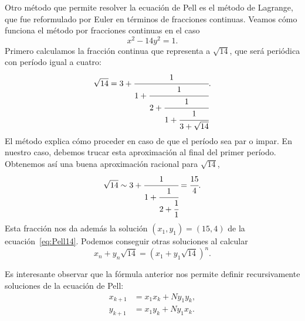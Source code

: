 Otro método que permite resolver la ecuación de Pell es el método de Lagrange,
que fue reformulado por Euler en términos de fracciones continuas. 
%
%
Veamos cómo funciona el método por fracciones continuas en el caso
\begin{equation}
	\label{eq:Pell14}
	x^2-14y^2=1.
\end{equation}
Primero calculamos la fracción continua que representa a $\sqrt{14}$, que será
periódica con período igual a cuatro:
\[
	\sqrt{14}=3+\cfrac{1}{1+\cfrac{1}{2+\cfrac{1}{1+\cfrac{1}{3+\sqrt{14}}}}}.
\]
El método explica cómo proceder en caso de que el período sea par o impar. En
nuestro caso, debemos trucar esta aproximación al final del primer período.
Obtenemos así una buena aproximación racional para $\sqrt{14}$, 
\[
	\sqrt{14}\sim 3+\cfrac{1}{1+\cfrac{1}{2+\cfrac{1}{1}}}=\cfrac{15}{4}.
\]
Esta fracción nos da además la solución $(x_1,y_1)=(15,4)$ de la
ecuación~\eqref{eq:Pell14}.  Podemos conseguir otras soluciones al calcular
\[
	x_n+y_n\sqrt{14}=(x_1+y_1\sqrt{14})^n.
\]

Es interesante observar que 
la fórmula anterior nos permite definir recursivamente soluciones de la
ecuación de Pell:
\begin{align*}
	x_{k+1} &= x_1x_k+Ny_1y_k,\\
	y_{k+1} &= x_1y_k+Ny_1x_k.
\end{align*}

